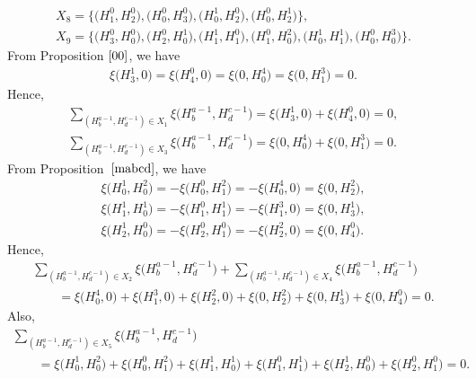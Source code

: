 \documentclass[10pt,a4paper]{amsart}
\numberwithin{equation}{section}
\begin{document}
\begin{Example}
\begin{gather*}
X_8=\bigl\{\bigl(H^{0}_{1},H^{0}_{2}\bigr),\bigl(H^{0}_{0},H^{0}_{3}\bigr),\bigl(H^{1}_{0},H^{0}_{2}\bigr),\bigl(H^{0}_{0},H^{1}_{2}\bigr)\bigr\},\\
X_9=\bigl\{\bigl(H^{0}_{3},H^{0}_{0}\bigr),\bigl(H^{0}_{2},H^{1}_{0}\bigr),\bigl(H^{1}_{1},H^{0}_{1}\bigr),\bigl(H^{0}_{1},H^{2}_{0}\bigr),\bigl(H^{1}_{0},H^{1}_{1}\bigr),\bigl(H^{0}_{0},H^{3}_{0}\bigr)\bigr\}.
\end{gather*}
From {\rm Proposition} $\ref{00}$, we have
\begin{gather*}
\xi\bigl(H^{1}_{3},0\bigr)=\xi\bigl(H^{0}_{4},0\bigr)=\xi\bigl(0,H^{4}_{0}\bigr)=\xi\bigl(0,H^{3}_{1}\bigr)=0.
\end{gather*}
Hence,
\begin{gather*}
\sum_{(H^{a-1}_{b},H^{c-1}_{d})\in X_1}\xi\bigl(H^{a-1}_{b},H^{c-1}_{d}\bigr)=\xi\bigl(H^{1}_{3},0\bigr)+\xi\bigl(H^{0}_{4},0\bigr)=0,
\\
\sum_{(H^{a-1}_{b},H^{c-1}_{d})\in X_3}\xi\bigl(H^{a-1}_{b},H^{c-1}_{d}\bigr)=\xi\bigl(0,H^{4}_{0}\bigr)+\xi\bigl(0,H^{3}_{1}\bigr)=0.
\end{gather*}
From {\rm Proposition}\ $\ref{mabcd}$, we have
\begin{gather*}
\xi\bigl(H^{1}_{0},H^{2}_{0}\bigr)=-\xi\bigl(H^{0}_{0},H^{2}_{1}\bigr)=-\xi\bigl(H^{4}_{0},0\bigr)=\xi\bigl(0,H^{2}_{2}\bigr),\\%
\xi\bigl(H^{1}_{1},H^{1}_{0}\bigr)=-\xi\bigl(H^{0}_{1},H^{1}_{1}\bigr)=-\xi\bigl(H^{3}_{1},0\bigr)=\xi\bigl(0,H^{1}_{3}\bigr),\\%
\xi\bigl(H^{1}_{2},H^{0}_{0}\bigr)=-\xi\bigl(H^{0}_{2},H^{0}_{1}\bigr)=-\xi\bigl(H^{2}_{2},0\bigr)=\xi\bigl(0,H^{0}_{4}\bigr).%
\end{gather*}
Hence,
\begin{gather*}
\sum_{(H^{a-1}_{b},H^{c-1}_{d})\in X_2}\xi\bigl(H^{a-1}_{b},H^{c-1}_{d}\bigr)+\sum_{(H^{a-1}_{b},H^{c-1}_{d})\in X_4}\xi\bigl(H^{a-1}_{b},H^{c-1}_{d}\bigr)\\
\qquad{}=\xi\bigl(H^{4}_{0},0\bigr)+\xi\bigl(H^{3}_{1},0\bigr)+\xi\bigl(H^{2}_{2},0\bigr)+\xi\bigl(0,H^{2}_{2}\bigr)+\xi\bigl(0,H^{1}_{3}\bigr)+\xi\bigl(0,H^{0}_{4}\bigr)=0.
\end{gather*}
Also,
\begin{gather*}
\sum_{(H^{a-1}_{b},H^{c-1}_{d})\in X_5}\xi\bigl(H^{a-1}_{b},H^{c-1}_{d}\bigr)\\
\qquad{}=\xi\bigl(H^{1}_{0},H^{2}_{0}\bigr)+\xi\bigl(H^{0}_{0},H^{2}_{1}\bigr)+\xi\bigl(H^{1}_{1},H^{1}_{0}\bigr)+\xi\bigl(H^{0}_{1},H^{1}_{1}\bigr)+\xi\bigl(H^{1}_{2},H^{0}_{0}\bigr)+\xi\bigl(H^{0}_{2},H^{0}_{1}\bigr)=0.

\end{gather*}
\end{Example}
\end{document}
